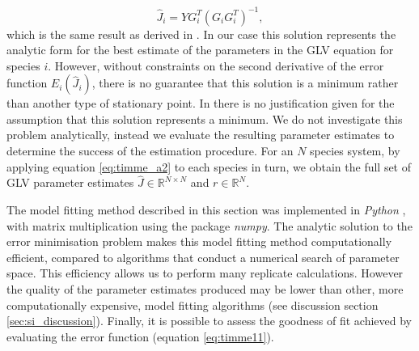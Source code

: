 \begin{equation}\label{eq:timme_a2}
\hat{J}_i = YG^T_i\left(G_iG^T_i\right)^{-1},
\end{equation}
%
which is the same result as derived in \cite{}. In our case this solution represents the analytic form for the best estimate of the parameters in the GLV equation for species $i$. However, without constraints on the second derivative of the error function $E_i(\hat{J}_i)$, there is no guarantee that this solution is a minimum rather than another type of stationary point. In \cite{} there is no justification given for the assumption that this solution represents a minimum. We do not investigate this problem analytically, instead we evaluate the resulting parameter estimates to determine the success of the estimation procedure. For an $N$ species system, by applying equation \eqref{eq:timme_a2} to each species in turn, we obtain the full set of GLV parameter estimates $\hat{J} \in \mathbb{R}^{N \times N}$ and $r \in \mathbb{R}^N$.

%

The model fitting method described in this section was implemented in \emph{Python} \cite{python}, with matrix multiplication using the package \emph{numpy}. The analytic solution to the error minimisation problem makes this model fitting method computationally efficient, compared to algorithms that conduct a numerical search of parameter space. This efficiency allows us to perform many replicate calculations. However the quality of the parameter estimates produced may be lower than other, more computationally expensive, model fitting algorithms (see discussion section \ref{sec:si_discussion}). Finally, it is possible to assess the goodness of fit achieved by evaluating the error function (equation \eqref{eq:timme11}). 


